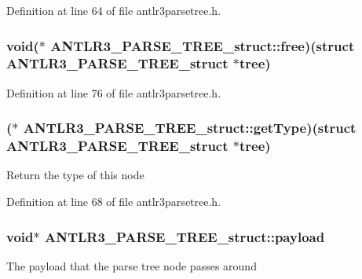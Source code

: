 Definition at line 64 of file antlr3parsetree.\-h.

\hypertarget{struct_a_n_t_l_r3___p_a_r_s_e___t_r_e_e__struct_aff34d95f433312b2483b89082fb598c9}{
\subsubsection[{free}]{\setlength{\rightskip}{0pt plus 5cm}void($\ast$ A\-N\-T\-L\-R3\-\_\-\-P\-A\-R\-S\-E\-\_\-\-T\-R\-E\-E\-\_\-struct\-::free)(struct {\bf A\-N\-T\-L\-R3\-\_\-\-P\-A\-R\-S\-E\-\_\-\-T\-R\-E\-E\-\_\-struct} $\ast$tree)}}\label{struct_a_n_t_l_r3___p_a_r_s_e___t_r_e_e__struct_aff34d95f433312b2483b89082fb598c9}


Definition at line 76 of file antlr3parsetree.\-h.

\hypertarget{struct_a_n_t_l_r3___p_a_r_s_e___t_r_e_e__struct_a409c3365960de7a7e06ee2f98fc067df}{
\subsubsection[{get\-Type}]{($\ast$ A\-N\-T\-L\-R3\-\_\-\-P\-A\-R\-S\-E\-\_\-\-T\-R\-E\-E\-\_\-struct\-::get\-Type)(struct {\bf A\-N\-T\-L\-R3\-\_\-\-P\-A\-R\-S\-E\-\_\-\-T\-R\-E\-E\-\_\-struct} $\ast$tree)}}\label{struct_a_n_t_l_r3___p_a_r_s_e___t_r_e_e__struct_a409c3365960de7a7e06ee2f98fc067df}
Return the type of this node 

Definition at line 68 of file antlr3parsetree.\-h.

\hypertarget{struct_a_n_t_l_r3___p_a_r_s_e___t_r_e_e__struct_ac014f0f8331803c4fa11bc196bbcb052}{
\subsubsection[{payload}]{\setlength{\rightskip}{0pt plus 5cm}void$\ast$ A\-N\-T\-L\-R3\-\_\-\-P\-A\-R\-S\-E\-\_\-\-T\-R\-E\-E\-\_\-struct\-::payload}}\label{struct_a_n_t_l_r3___p_a_r_s_e___t_r_e_e__struct_ac014f0f8331803c4fa11bc196bbcb052}
The payload that the parse tree node passes around 

